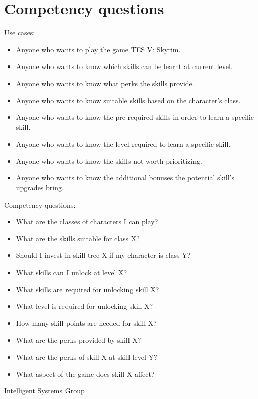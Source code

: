 \documentclass[a4paper,12pt]{report}
\begin{document}
\section{Competency questions}
Use cases:
\begin{itemize}
 \item Anyone who wants to play the game TES V: Skyrim.
 \item Anyone who wants to know which skills can be learnt at current level.
 \item Anyone who wants to know what perks the skills provide.
 \item Anyone who wants to know suitable skills based on the character's class.
 \item Anyone who wants to know the pre-required skills in order to learn a specific skill.
 \item Anyone who wants to know the level required to learn a specific skill.
 \item Anyone who wants to know the skills not worth prioritizing. 
 \item Anyone who wants to know the additional bonuses the potential skill's upgrades bring. 
\end{itemize}
\hfill \break
Competency questions:
\begin{itemize}
  \item What are the classes of characters I can play?
  \item What are the skills suitable for class X?
  \item Should I invest in skill tree X if my character is class Y?
  \item What skills can I unlock at level X?
  \item What skills are required for unlocking skill X?
  \item What level is required for unlocking skill X?
  \item How many skill points are needed for skill X?
  \item What are the perks provided by skill X?
  \item What are the perks of skill X at skill level Y?
  \item What aspect of the game does skill X affect?

\end{itemize}




\vspace{2cm}
\begin{center}
Intelligent Systems Group\\
\end{center}
\end{document}

